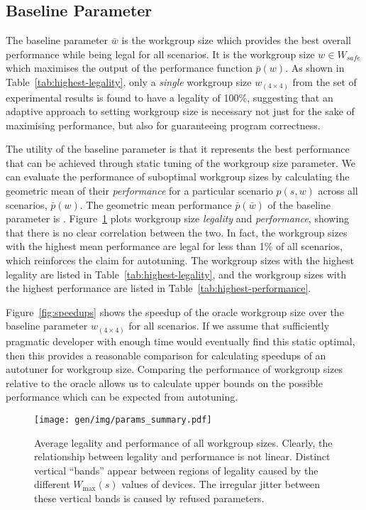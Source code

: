 

\subsection{Baseline Parameter}\label{subsec:baseline}

The baseline parameter $\bar{w}$ is the workgroup size which provides
the best overall performance while being legal for all scenarios. It
is the workgroup size $w \in W_{safe}$ which maximises the output of
the performance function $\bar{p}(w)$. As shown in
Table~\ref{tab:highest-legality}, only a \emph{single} workgroup size
$w_{(4 \times 4)}$ from the set of experimental results is found to
have a legality of 100\%, suggesting that an adaptive approach to
setting workgroup size is necessary not just for the sake of
maximising performance, but also for guaranteeing program correctness.

The utility of the baseline parameter is that it represents the best
performance that can be achieved through static tuning of the
workgroup size parameter. We can evaluate the performance of
suboptimal workgroup sizes by calculating the geometric mean of their
\emph{performance} for a particular scenario $p(s, w)$ across all
scenarios, $\bar{p}(w)$. The geometric mean performance
$\bar{p}(\bar{w})$ of the baseline parameter is
. Figure~\ref{fig:performance-legality} plots
workgroup size \emph{legality} and \emph{performance}, showing that
there is no clear correlation between the two. In fact, the workgroup
sizes with the highest mean performance are legal for less than 1\% of
all scenarios, which reinforces the claim for autotuning. The
workgroup sizes with the highest legality are listed in
Table~\ref{tab:highest-legality}, and the workgroup sizes with the
highest performance are listed in Table~\ref{tab:highest-performance}.

Figure~\ref{fig:speedups} shows the speedup of the oracle workgroup
size over the baseline parameter $w_{(4 \times 4)}$ for all
scenarios. If we assume that sufficiently pragmatic developer with
enough time would eventually find this static optimal, then this
provides a reasonable comparison for calculating speedups of an
autotuner for workgroup size. Comparing the performance of workgroup
sizes relative to the oracle allows us to calculate upper bounds on
the possible performance which can be expected from autotuning.


\begin{figure}
\centering
\texttt{[image: gen/img/params\_summary.pdf]}
\caption{%
  Average legality and performance of all workgroup sizes. Clearly,
  the relationship between legality and performance is not
  linear. Distinct vertical ``bands'' appear between regions of
  legality caused by the different $W_{\max}(s)$ values of
  devices. The irregular jitter between these vertical bands is caused
  by refused parameters.%
}
\label{fig:performance-legality}
\end{figure}


